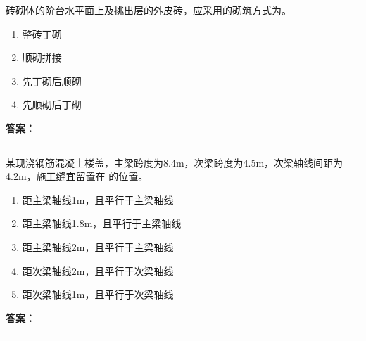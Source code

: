 \documentclass[UTF8,fontset=fandol,11pt]{ctexart}
\newcommand{\answerline}{\textcolor{answerred}{\rule{2.4cm}{0.7pt}}}
\begin{document}
\begin{quizbox}[title={乱序第 221 题｜第六章砌筑工程}]

砖砌体的阶台水平面上及挑出层的外皮砖，应采用的砌筑方式为。\\

\begin{enumerate}[label=\Alph*.]

\item 整砖丁砌

\item 顺砌拼接

\item 先丁砌后顺砌

\item 先顺砌后丁砌

\end{enumerate}

\textbf{\textcolor{answerred}{答案：}} \answerline

\end{quizbox}

\vspace{0.2em}

\begin{quizbox}[title={乱序第 222 题｜第四章混凝土结构工程}]

某现浇钢筋混凝土楼盖，主梁跨度为8.4m，次梁跨度为4.5m，次梁轴线间距为4.2m，施工缝宜留置在 的位置。\\

\begin{enumerate}[label=\Alph*.]

\item 距主梁轴线1m，且平行于主梁轴线

\item 距主梁轴线1.8m，且平行于主梁轴线

\item 距主梁轴线2m，且平行于主梁轴线

\item 距次梁轴线2m，且平行于次梁轴线

\item 距次梁轴线1m，且平行于次梁轴线

\end{enumerate}

\textbf{\textcolor{answerred}{答案：}} \answerline

\end{quizbox}

\vspace{0.2em}
\end{document}
